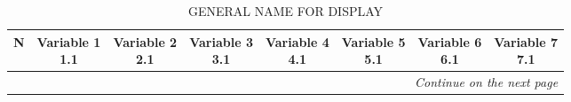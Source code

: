 \begin{landscape}
\begin{longtable}{cc cc cc cc}
\caption[NAME FOR TOC ]{ GENERAL NAME FOR DISPLAY}
\label{tab:NDSum1}\\
\toprule
N
    &   \makecell[b]{Variable 1\\1.1 }
        &   \makecell[b]{Variable 2 \\ 2.1}  
           &   \makecell[b]{Variable 3 \\ 3.1 }
              &   \makecell[b]{Variable 4 \\4.1 }  
                 &   \makecell[b]{ Variable 5 \\ 5.1}
                   &   \makecell[b]{Variable 6\\ 6.1}
                     &   \makecell[b]{ Variable 7\\7.1 }  \\

    \midrule
\endfirsthead
    \midrule
    \multicolumn{8}{r}{\footnotesize\itshape Continue on the next page}
\endfoot
    \bottomrule
\endlastfoot


\end{longtable}
\end{landscape}
